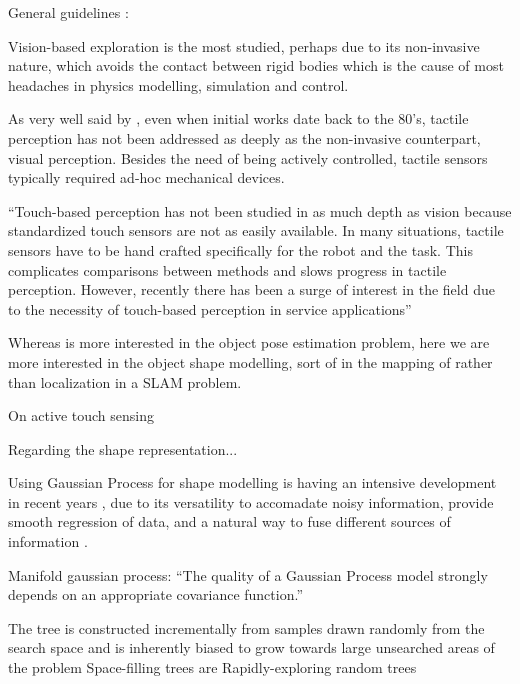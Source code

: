 \documentclass[twocolumn,draft,natbib]{svjour3}
\begin{document}
General guidelines : \citet{Bajcsy1989Machine}

Vision-based exploration is the most studied, perhaps due to its non-invasive nature, which avoids the contact between rigid bodies which is the cause of most headaches in physics modelling, simulation and control.

As very well said by \citet{Petrovskaya2011Global}, even when initial works date back to the 80's, tactile perception has not been addressed as deeply as the non-invasive counterpart, visual perception. Besides the need of being actively controlled, tactile sensors typically required ad-hoc mechanical devices.

``Touch-based perception has not been studied in as much depth
as vision because standardized touch sensors are not as easily
available. In many situations, tactile sensors have to be hand
crafted specifically for the robot and the task. This complicates
comparisons between methods and slows progress in tactile
perception. However, recently there has been a surge of interest
in the field due to the necessity of touch-based perception in
service applications''

Whereas \citet{Petrovskaya2011Global} is more interested in the object pose estimation problem, here we are more interested in the object shape modelling, sort of in the mapping of rather than localization in a SLAM problem.

On active touch sensing \citet{Prescott2011Active}


Regarding the shape representation...

Using Gaussian Process for shape modelling is having an intensive development in recent years \citep{Mahler2015Grasp,Rosales2014Active,Bjorkman2013Enhancing,Dragiev2011Gaussian}, due to its versatility to accomadate noisy information, provide smooth regression of data, and a natural way to fuse different sources of information \citep{Rasmussen2006Gaussian}.

Manifold gaussian process: \citet{Calandra2014Manifold} ``The quality of a Gaussian Process model strongly depends on an appropriate covariance function.''

The tree is constructed incrementally from samples drawn randomly from the search space and is inherently biased to grow towards large unsearched areas of the problem
Space-filling trees are 
Rapidly-exploring random trees \citet{LaValle2011Motion}
\end{document}
